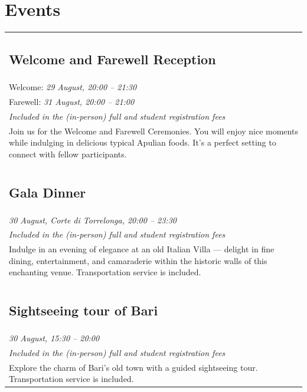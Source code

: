 \documentclass[
	openany, %
	parskip=full, %
	12pt, %
	a4paper, %
]{conferencebooklet} %
\begin{document}
\chapter{Events}
    \begin{multicols*}{2}
        \begin{tabular}{p{75mm}}
            \parbox{75mm}{\section{Welcome and Farewell Reception}} \vspace{2mm} \\
            Welcome: \textit{29 August, 20:00 – 21:30} \\
            Farewell: \textit{31 August, 20:00 – 21:00} \vspace{2mm} \\ 
            \textit{Included in the (in-person) full and student registration fees}
            \vspace{2mm} \\
            Join us for the Welcome and Farewell Ceremonies. You will enjoy nice moments while indulging in delicious typical Apulian foods. It’s a perfect setting to connect with fellow participants.
            \\ \\

            \parbox{75mm}{\section{Gala Dinner}} \vspace{1mm} \\
            \textit{30 August, Corte di Torrelonga, 20:00 – 23:30} \vspace{2mm} \\
            \textit{Included in the (in-person) full and student registration fees} \vspace{2mm} \\
            Indulge in an evening of elegance at an old Italian Villa — delight in fine dining, entertainment, and camaraderie within the historic walls of this enchanting venue. Transportation service is included.
            \\ \\ 

            \parbox{75mm}{\section{Sightseeing tour of Bari}} \\
            \textit{30 August, 15:30 – 20:00} \vspace{2mm} \\ 
            \textit{Included in the (in-person) full and student registration fees} \vspace{2mm} \\
            Explore the charm of Bari’s old town with a guided sightseeing tour. Transportation service is included.
        \end{tabular}


\end{multicols*}
\end{document}
